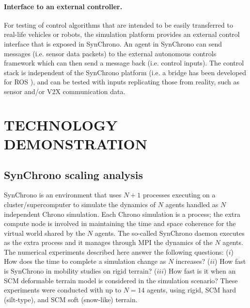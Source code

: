 \documentclass[12pt,twocolumn]{article}
\begin{document}
\paragraph{Interface to an external controller.} For testing of control algorithms that are intended to be easily transferred to real-life vehicles or robots, the simulation platform provides an external control interface that is exposed in SynChrono. An agent in SynChrono can send messages (i.e. sensor data packets) to the external autonomous controls framework which can then send a message back (i.e. control inputs). The control stack is independent of the SynChrono platform (i.e. a bridge has been developed for ROS \cite{ROS-2009}), and can be tested with inputs replicating those from reality, such as sensor and/or V2X communication data.

\section{TECHNOLOGY DEMONSTRATION}
\label{sec:demoTechnology}


\subsection{SynChrono scaling analysis}\label{sec:syn-scaling-analysis} 
SynChrono is an environment that uses $N+1$ processes executing on a cluster/supercomputer to simulate the dynamics of $N$ agents handled as $N$ independent Chrono simulation. Each Chrono simulation is a process; the extra compute node is involved in maintaining the time and space coherence for the virtual world shared by the $N$ agents. The so-called SynChrono daemon executes as the extra process and it manages through MPI the dynamics of the $N$ agents. The numerical experiments described here answer the following questions: ($i$) How does the time to complete a simulation change as $N$ increases? ($ii$) How fast is SynChrono in mobility studies on rigid terrain? ($iii$) How fast is it when an SCM deformable terrain model is considered in the simulation scenario? These experiments were conducted with up to $N=14$ agents, using rigid, SCM hard (silt-type), and SCM soft (snow-like) terrain.  
\end{document}
